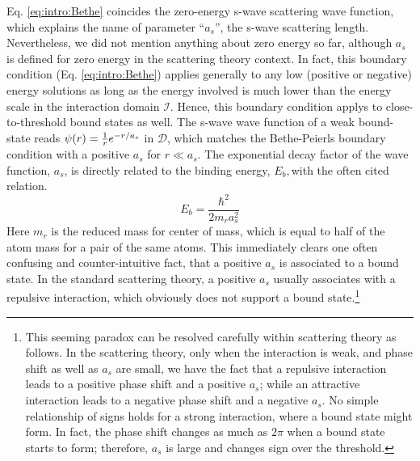 Eq. \ref{eq:intro:Bethe} coincides the zero-energy s-wave scattering wave function, which explains the name of parameter ``$a_s$'', the s-wave scattering length. Nevertheless,    we did not mention anything about zero energy so far, although $a_{s}$ is defined for zero energy in the scattering theory context.  In fact,  this boundary condition (Eq. \ref{eq:intro:Bethe}) applies generally to  any low (positive or negative) energy solutions as long as the energy involved is much lower than the energy scale in the interaction domain $\mathcal{I}$.  Hence, this boundary condition applys  to close-to-threshold bound states as well.  The s-wave wave function of a weak bound-state reads $\psi(r)=\frac{1}{r}e^{-r/a_s}$ in $\mathcal{D}$, which matches the Bethe-Peierls boundary condition with a positive $a_{s}$ for  $r\ll{}a_{s}$. The exponential decay factor of the wave function, $a_{s}$, is directly related to the binding energy, $E_{b},$with the often cited relation.
\begin{equation}
 E_{b}=\frac{\hbar^{2}}{2m_{r}a_{s}^{2}}
\end{equation}
Here $m_{r}$ is the reduced mass for center of mass, which is equal to half of the atom mass for a pair of the same atoms.  This immediately clears one often confusing and counter-intuitive fact, that a positive  $a_s$ is associated to a bound state.  In the standard scattering theory, a positive $a_s$  usually associates with a repulsive interaction, which obviously does not support a bound state.\footnote{This seeming paradox can be resolved carefully within scattering theory as follows. In the scattering theory, only when the interaction is weak, and phase shift as well as $a_s$ are small, we have the fact that a repulsive interaction leads to a positive phase shift and a positive $a_s$; while an attractive interaction leads to a negative phase shift and a negative $a_s$.  No simple relationship of signs holds for a strong interaction, where a bound state might form.  In fact, the phase shift changes as much as $2\pi$ when a bound state starts to form; therefore, $a_s$ is large and  changes sign over the threshold. }


